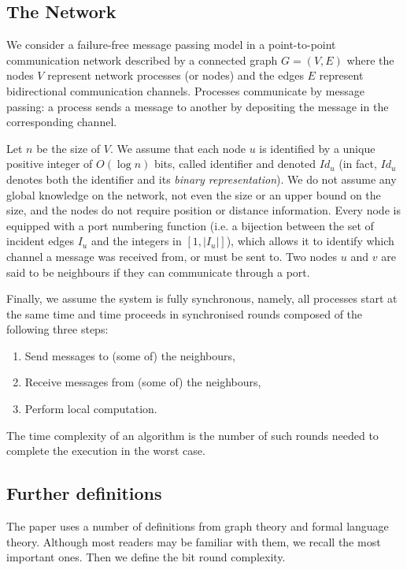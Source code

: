 \documentclass[11pt,envcountsame,letterpaper]{llncs}
\begin{document}
\subsection{The Network}
We consider a failure-free message passing model
in a point-to-point
communication network described by a   connected graph 
$G=(V,E)$
where the nodes $V$ represent network processes (or nodes) and the edges $E$
represent bidirectional communication channels. Processes communicate
by message passing: a process sends a message to another by depositing
the message in the corresponding channel. 

Let $n$ be the size of $V$.
We assume that each node  $u$ is identified by a unique
positive integer of $O(\log n)$ bits, called identifier and denoted $Id_u$
(in fact, $Id_u$ denotes both the identifier and its {\em binary representation}).
 We do not assume any global knowledge on
the network, not even the size or an upper bound on the size, and the nodes do not require position or distance information. 
Every node is equipped with a port numbering function (i.e. a bijection between the set of incident edges $I_u$ and the integers in $[1,|I_u|]$), which allows it to identify which channel a message was received from, or must be sent to.
Two nodes $u$ and $v$ are said to be neighbours if they can communicate
through a port.

Finally, we assume the system is
fully synchronous, namely, all processes start at the same time
and time proceeds in synchronised rounds composed of the following three
steps: 
\begin{enumerate}
\item Send messages to (some of) the neighbours, 
\item Receive
messages from (some of) the neighbours, 
\item Perform local
computation.
\end{enumerate}
  The time complexity of an algorithm is the number of such rounds needed to complete the execution in the worst case.

\subsection{Further definitions}



The paper uses a number of definitions from graph theory and formal language theory. Although most readers may be familiar with them, we recall the most important ones. Then we define the bit round complexity.
\end{document}
